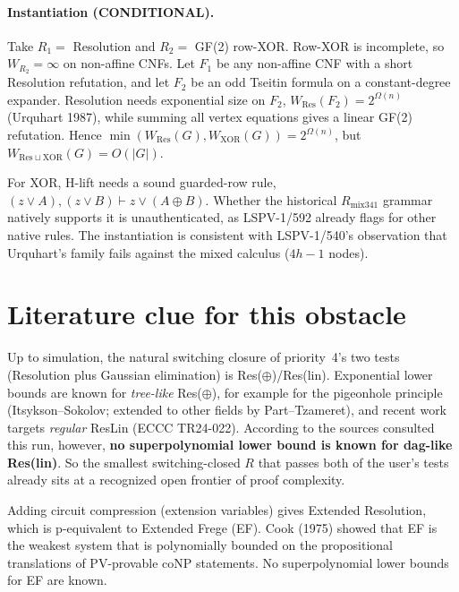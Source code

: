 \documentclass[11pt]{article}
\begin{document}
\paragraph{Instantiation (CONDITIONAL).} Take $R_1=$ Resolution and $R_2=$ GF(2) row-XOR. Row-XOR is incomplete, so $W_{R_2}=\infty$ on non-affine CNFs. Let $F_1$ be any non-affine CNF with a short Resolution refutation, and let $F_2$ be an odd Tseitin formula on a constant-degree expander. Resolution needs exponential size on $F_2$, $W_{\mathrm{Res}}(F_2)=2^{\Omega(n)}$ (Urquhart 1987), while summing all vertex equations gives a linear GF(2) refutation. Hence $\min(W_{\mathrm{Res}}(G),W_{\mathrm{XOR}}(G))=2^{\Omega(n)}$, but $W_{\mathrm{Res}\sqcup\mathrm{XOR}}(G)=O(|G|)$.

For XOR, H-lift needs a sound guarded-row rule, $(z\vee A),(z\vee B)\vdash z\vee(A\oplus B)$. Whether the historical $R_{\mathrm{mix341}}$ grammar natively supports it is unauthenticated, as LSPV-1/592 already flags for other native rules. The instantiation is consistent with LSPV-1/540's observation that Urquhart's family fails against the mixed calculus ($4h-1$ nodes).

\section{Literature clue for this obstacle}
Up to simulation, the natural switching closure of priority~4's two tests (Resolution plus Gaussian elimination) is Res($\oplus$)/Res(lin). Exponential lower bounds are known for \emph{tree-like} Res($\oplus$), for example for the pigeonhole principle (Itsykson--Sokolov; extended to other fields by Part--Tzameret), and recent work targets \emph{regular} ResLin (ECCC TR24-022). According to the sources consulted this run, however, \textbf{no superpolynomial lower bound is known for dag-like Res(lin)}. So the smallest switching-closed $R$ that passes both of the user's tests already sits at a recognized open frontier of proof complexity.

Adding circuit compression (extension variables) gives Extended Resolution, which is p-equivalent to Extended Frege (EF). Cook (1975) showed that EF is the weakest system that is polynomially bounded on the propositional translations of PV-provable coNP statements. No superpolynomial lower bounds for EF are known.
\end{document}
